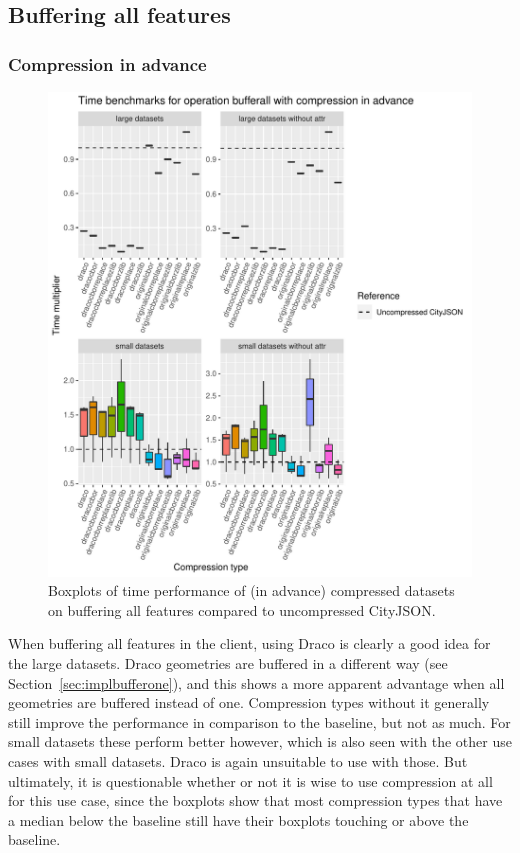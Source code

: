 \newpage

\subsection{Buffering all features}
\label{resultsbufferall}

\subsubsection{Compression in advance}

\begin{figure}[h!]
    \includegraphics[scale=0.92]{figs/benchmark/individual/bufferall.pdf}
    \caption{Boxplots of time performance of (in advance) compressed datasets on buffering all features compared to uncompressed CityJSON.}
    \label{fig:sdvis}
\end{figure}

When buffering all features in the client, using Draco is clearly a good idea for the large datasets.
Draco geometries are buffered in a different way (see Section~\ref{sec:implbufferone}), and this shows a more apparent advantage when all geometries are buffered instead of one.
Compression types without it generally still improve the performance in comparison to the baseline, but not as much.
For small datasets these perform better however, which is also seen with the other use cases with small datasets.
Draco is again unsuitable to use with those.
But ultimately, it is questionable whether or not it is wise to use compression at all for this use case, since the boxplots show that most compression types that have a median below the baseline still have their boxplots touching or above the baseline.

